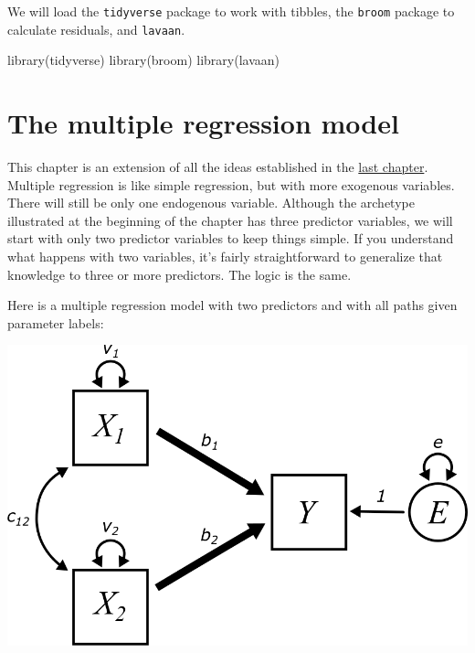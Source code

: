 \documentclass[
]{book}
\newenvironment{Shaded}{\begin{snugshade}}{\end{snugshade}}
\newcommand{\FunctionTok}[1]{\textcolor[rgb]{0.00,0.00,0.00}{#1}}
\newcommand{\NormalTok}[1]{#1}
\begin{document}
We will load the \texttt{tidyverse} package to work with tibbles, the \texttt{broom} package to calculate residuals, and \texttt{lavaan}.

\begin{Shaded}
\begin{Highlighting}[]
\FunctionTok{library}\NormalTok{(tidyverse)}
\FunctionTok{library}\NormalTok{(broom)}
\FunctionTok{library}\NormalTok{(lavaan)}
\end{Highlighting}
\end{Shaded}

\hypertarget{multiple-model}{%
\section{The multiple regression model}\label{multiple-model}}

This chapter is an extension of all the ideas established in the \protect\hyperlink{simple}{last chapter}. Multiple regression is like simple regression, but with more exogenous variables. There will still be only one endogenous variable. Although the archetype illustrated at the beginning of the chapter has three predictor variables, we will start with only two predictor variables to keep things simple. If you understand what happens with two variables, it's fairly straightforward to generalize that knowledge to three or more predictors. The logic is the same.

Here is a multiple regression model with two predictors and with all paths given parameter labels:

\begin{center}\includegraphics{graphics/multiple_regression_2} \end{center}
\end{document}
